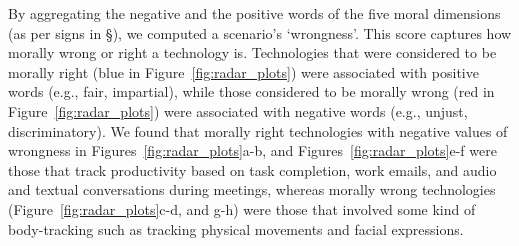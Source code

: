 By aggregating the negative and the positive words of the five moral dimensions (as per signs in \S{}), we computed a scenario's `wrongness'. This score captures how morally wrong or right a technology is. Technologies that were considered to be morally right (blue in Figure~\ref{fig:radar_plots}) were associated with positive words (e.g., fair, impartial), while those considered to be morally wrong (red in Figure~\ref{fig:radar_plots}) were associated with negative words (e.g., unjust, discriminatory). We found that morally right technologies with negative values of wrongness in Figures~\ref{fig:radar_plots}a-b, and Figures~\ref{fig:radar_plots}e-f were those that track productivity based on task completion, work emails, and audio and textual conversations during meetings, whereas morally wrong technologies (Figure~\ref{fig:radar_plots}c-d, and g-h) were those that involved some kind of body-tracking such as tracking physical movements and facial expressions. 